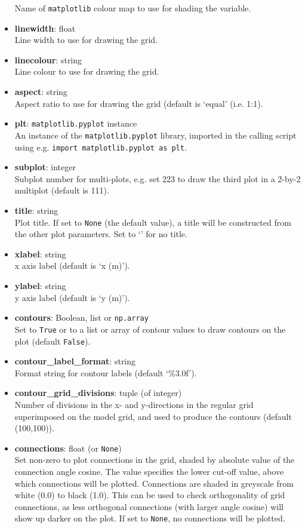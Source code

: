 \begin{itemize}
  Name of \texttt{matplotlib} colour map to use for shading the variable.
\item \textbf{linewidth}: float\\
  Line width to use for drawing the grid.
\item \textbf{linecolour}: string\\
  Line colour to use for drawing the grid.
\item \textbf{aspect}: string\\
  Aspect ratio to use for drawing the grid (default is `equal' (i.e. 1:1).
\item \textbf{plt}: \texttt{matplotlib.pyplot} instance\\
  An instance of the \texttt{matplotlib.pyplot} library, imported in the calling script using e.g. \texttt{import matplotlib.pyplot as plt}.
\item \textbf{subplot}: integer\\
  Subplot number for multi-plots, e.g. set 223 to draw the third plot in a 2-by-2 multiplot (default is 111).
\item \textbf{title}: string\\
  Plot title.  If set to \texttt{None} (the default value), a title will be constructed from the other plot parameters.  Set to `' for no title.
\item \textbf{xlabel}: string\\
  x axis label (default is `x (m)').
\item \textbf{ylabel}: string\\
  y axis label (default is `y (m)').
\item \textbf{contours}: Boolean, list or \texttt{np.array}\\
  Set to \texttt{True} or to a list or array of contour values to draw contours on the plot (default \texttt{False}).
\item \textbf{contour\_label\_format}: string\\
  Format string for contour labels (default `\%3.0f').
\item \textbf{contour\_grid\_divisions}: tuple (of integer)\\
  Number of divisions in the x- and y-directions in the regular grid superimposed on the model grid, and used to produce the contours (default (100,100)).
\item \textbf{connections}: float (or \texttt{None})\\
  Set non-zero to plot connections in the grid, shaded by absolute value of the connection angle cosine.  The value specifies the lower cut-off value, above which connections will be plotted.  Connections are shaded in greyscale from white (0.0) to black (1.0).  This can be used to check orthogonality of grid connections, as less orthogonal connections (with larger angle cosine) will show up darker on the plot.  If set to \texttt{None}, no connections will be plotted.
\end{itemize}

